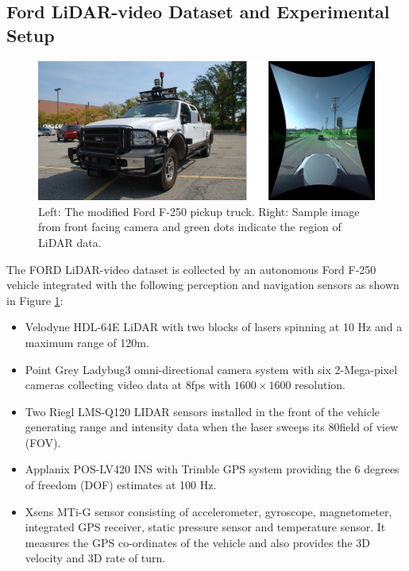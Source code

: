 \documentclass{article}
\begin{document}
\subsection{Ford LiDAR-video Dataset and Experimental Setup} %
\label{sub:ford_lidar_video_dataset_and_experimental_setup}

\begin{figure}[htbp]
    \centering
        \includegraphics[scale=0.45]{Figures/ford-truck-sensors-final.png}
    \caption{Left: The modified Ford F-250 pickup truck. Right: Sample image from front facing camera and green dots indicate the region of LiDAR data.}
    \label{fig:ford-truck-sensors}
\end{figure}

The FORD LiDAR-video dataset \cite{Pandey2011Ford-campu} is collected by an autonomous Ford F-250 vehicle integrated with the following perception and navigation sensors as shown in Figure \ref{fig:ford-truck-sensors}:
\begin{itemize}
    \item Velodyne HDL-64E LiDAR with two blocks of lasers spinning at 10 Hz and a maximum range of 120m.
    \item Point Grey Ladybug3 omni-directional camera system with six 2-Mega-pixel cameras collecting video data at 8fps with $1600\times1600$ resolution.
    \item Two Riegl LMS-Q120 LIDAR sensors installed in the front of the vehicle generating range and intensity data when the laser sweeps its 80\degree field of view (FOV).
    \item Applanix POS-LV420 INS with Trimble GPS system providing the 6 degrees of freedom (DOF) estimates at 100 Hz.
    \item Xsens MTi-G sensor consisting of accelerometer, gyroscope, magnetometer, integrated GPS receiver, static pressure sensor and temperature sensor. It measures the GPS co-ordinates of the vehicle and also provides the 3D velocity and 3D rate of turn.
\end{itemize}
\end{document}
